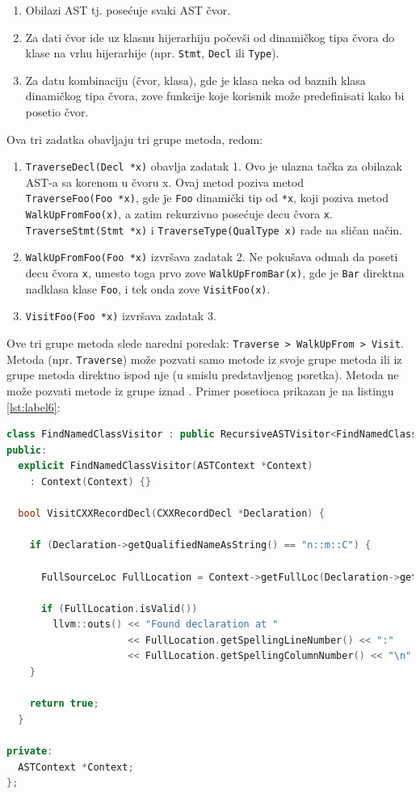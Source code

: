 \documentclass[12pt,oneside]{memoir}
\begin{document}
\begin{enumerate}
\item Obilazi AST tj. posećuje svaki AST čvor.
\item Za dati čvor ide uz klasnu hijerarhiju počevši od dinamičkog tipa čvora do klase na vrhu hijerarhije (npr. \lstinline{Stmt}, \lstinline{Decl} ili \lstinline{Type}).
\item Za datu kombinaciju (čvor, klasa), gde je klasa neka od baznih klasa dinamičkog tipa čvora, zove funkcije koje korisnik može predefinisati kako bi posetio čvor.
\end{enumerate}
Ova tri zadatka obavljaju tri grupe metoda, redom:
\begin{enumerate}
  \item \lstinline{TraverseDecl(Decl *x)} obavlja zadatak 1. Ovo je ulazna tačka za obilazak AST-a sa korenom u čvoru x. Ovaj metod poziva metod \\ \lstinline{TraverseFoo(Foo *x)}, gde je \lstinline{Foo} dinamički tip od \lstinline{*x}, koji poziva metod \lstinline{WalkUpFromFoo(x)}, a zatim rekurzivno posećuje decu čvora \lstinline{x}. \\ \lstinline{TraverseStmt(Stmt *x)} i \lstinline{TraverseType(QualType x)} rade na sličan način.
 
\item \lstinline{WalkUpFromFoo(Foo *x)} izvršava zadatak 2. Ne pokušava odmah da poseti decu čvora \lstinline{x}, umesto toga prvo zove \lstinline{WalkUpFromBar(x)}, gde je \lstinline{Bar} direktna nadklasa klase \lstinline{Foo}, i tek onda zove \lstinline{VisitFoo(x)}.
\item \lstinline{VisitFoo(Foo *x)} izvršava zadatak 3.
\end{enumerate}
Ove tri grupe metoda slede naredni poredak: \lstinline{Traverse > WalkUpFrom > Visit}. Metoda (npr. \lstinline{Traverse}) može pozvati samo metode iz svoje grupe metoda ili iz grupe metoda direktno ispod nje (u smislu predstavljenog poretka). Metoda ne može pozvati metode iz grupe iznad \cite{visitors}.
Primer posetioca prikazan je na listingu \ref{lst:label6}:
\begin{lstlisting}[caption={Primer posetioaca koji pose\'{c}uje sve strukture, unije i klase i ispisuje lokaciju onih koji se zovu n::m::C},label=lst:label6,language=C++, captionpos=b]
class FindNamedClassVisitor : public RecursiveASTVisitor<FindNamedClassVisitor> {
public:
  explicit FindNamedClassVisitor(ASTContext *Context)
    : Context(Context) {}

  bool VisitCXXRecordDecl(CXXRecordDecl *Declaration) {

    if (Declaration->getQualifiedNameAsString() == "n::m::C") {

      FullSourceLoc FullLocation = Context->getFullLoc(Declaration->getBeginLoc());

      if (FullLocation.isValid())
        llvm::outs() << "Found declaration at "
                     << FullLocation.getSpellingLineNumber() << ":"
                     << FullLocation.getSpellingColumnNumber() << "\n";
    }

    return true;
  }

private:
  ASTContext *Context;
};
\end{lstlisting}
\end{document}
